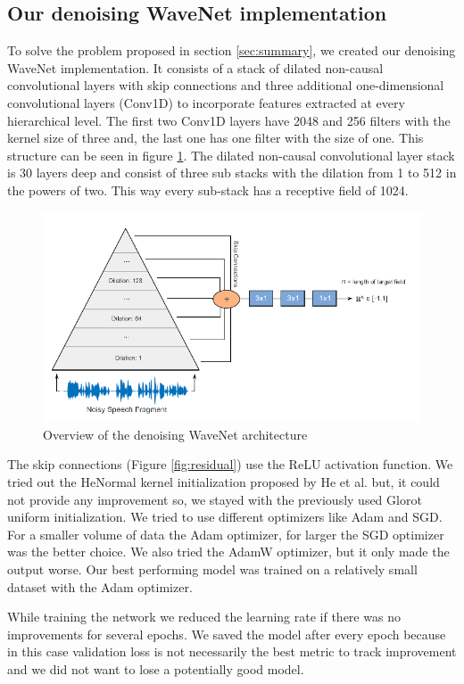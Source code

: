 \documentclass{article}
\begin{document}
	\subsection{Our denoising WaveNet implementation}
	\label{sec:own_wavenet}
	To solve the problem proposed in section \ref{sec:summary}, we created our denoising WaveNet implementation. It consists of a stack of dilated non-causal convolutional layers with skip connections and three additional one-dimensional convolutional layers (Conv1D) to incorporate features extracted at every hierarchical level. The first two Conv1D layers have 2048 and 256 filters with the kernel size of three and, the last one has one filter with the size of one. This structure can be seen in figure \ref{fig:own_wavenet}.
	 The dilated non-causal convolutional layer stack is 30 layers deep and consist of three sub stacks with the dilation from 1 to 512 in the powers of two. This way every sub-stack has a receptive field of 1024.
	\begin{figure}[!h]
		\centering
		\includegraphics[width=0.9\linewidth]{own_wavenet.png}
		\caption{Overview of the denoising WaveNet architecture}
		\label{fig:own_wavenet}
	\end{figure}
	The skip connections (Figure \ref{fig:residual}) use the ReLU activation function. We tried out the HeNormal kernel initialization proposed by He et al. \cite{he2015delving} but, it could not provide any improvement so, we stayed with the previously used Glorot uniform initialization.
	We tried to use different optimizers like Adam and SGD. For a smaller volume of data the Adam optimizer, for larger the SGD optimizer was the better choice. We also tried the AdamW\cite{adamw} optimizer, but it only made the output worse. Our best performing model was trained on a relatively small dataset with the Adam optimizer.

	While training the network we reduced the learning rate if there was no improvements for several epochs. We saved the model after every epoch because in this case validation loss is not necessarily the best metric to track improvement and we did not want to lose a potentially good model.
\end{document}
